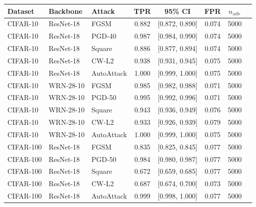 \begin{tabular}{lllccccc}
\toprule
Dataset & Backbone & Attack & TPR & 95\% CI & FPR & $n_{\text{adv}}$ \\
\midrule
CIFAR-10  & ResNet-18  & FGSM       & 0.882 & [0.872, 0.890] & 0.074 & 5000 \\
CIFAR-10  & ResNet-18  & PGD-40     & 0.987 & [0.984, 0.990] & 0.074 & 5000 \\
CIFAR-10  & ResNet-18  & Square     & 0.886 & [0.877, 0.894] & 0.074 & 5000 \\
CIFAR-10  & ResNet-18  & CW-L2      & 0.938 & [0.931, 0.945] & 0.075 & 5000 \\
CIFAR-10  & ResNet-18  & AutoAttack & 1.000 & [0.999, 1.000] & 0.075 & 5000 \\
\midrule
CIFAR-10  & WRN-28-10  & FGSM       & 0.985 & [0.982, 0.988] & 0.071 & 5000 \\
CIFAR-10  & WRN-28-10  & PGD-50     & 0.995 & [0.992, 0.996] & 0.071 & 5000 \\
CIFAR-10  & WRN-28-10  & Square     & 0.943 & [0.936, 0.949] & 0.076 & 5000 \\
CIFAR-10  & WRN-28-10  & CW-L2      & 0.933 & [0.926, 0.939] & 0.079 & 5000 \\
CIFAR-10  & WRN-28-10  & AutoAttack & 1.000 & [0.999, 1.000] & 0.075 & 5000 \\
\midrule
CIFAR-100 & ResNet-18  & FGSM       & 0.835 & [0.825, 0.845] & 0.077 & 5000 \\
CIFAR-100 & ResNet-18  & PGD-50     & 0.984 & [0.980, 0.987] & 0.077 & 5000 \\
CIFAR-100 & ResNet-18  & Square     & 0.672 & [0.659, 0.685] & 0.077 & 5000 \\
CIFAR-100 & ResNet-18  & CW-L2      & 0.687 & [0.674, 0.700] & 0.073 & 5000 \\
CIFAR-100 & ResNet-18  & AutoAttack & 0.999 & [0.998, 1.000] & 0.077 & 5000 \\
\bottomrule
\end{tabular}
